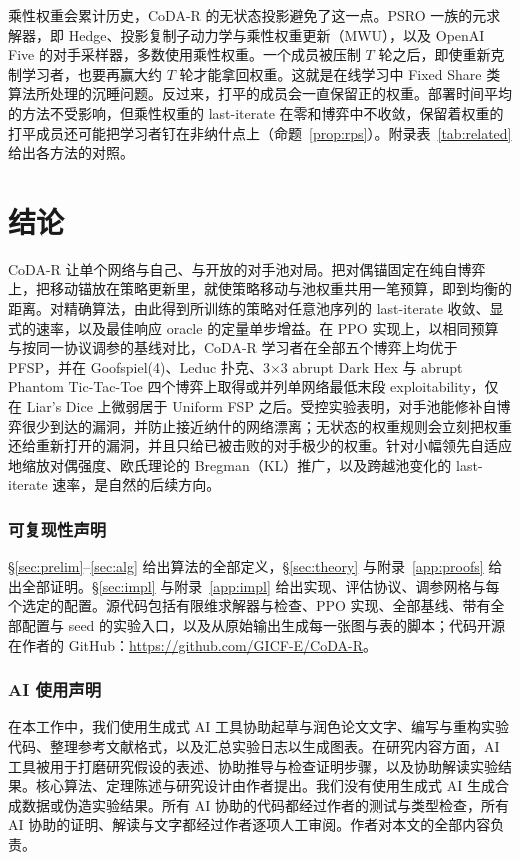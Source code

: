 \documentclass{article}
\theoremstyle{plain}
\theoremstyle{remark}
\newcommand{\codar}{CoDA-R}
\begin{document}
乘性权重会累计历史，\codar{} 的无状态投影避免了这一点。PSRO 一族的元求解器，即 Hedge、投影复制子动力学与乘性权重更新（MWU），以及 OpenAI Five 的对手采样器，多数使用乘性权重\citep{lanctot2017psro,mcaleer2022anytime,dinh2022odo,openai2019dota,freund1999hedge}。一个成员被压制 $T$ 轮之后，即使重新克制学习者，也要再赢大约 $T$ 轮才能拿回权重。这就是在线学习中 Fixed Share 类算法所处理的沉睡问题\citep{herbster1998tracking}。反过来，打平的成员会一直保留正的权重。部署时间平均的方法不受影响，但乘性权重的 last-iterate 在零和博弈中不收敛\citep{bailey2018mwu}，保留着权重的打平成员还可能把学习者钉在非纳什点上（命题~\ref{prop:rps}）。附录表~\ref{tab:related} 给出各方法的对照。

\section{结论}

\codar{} 让单个网络与自己、与开放的对手池对局。把对偶锚固定在纯自博弈上，把移动锚放在策略更新里，就使策略移动与池权重共用一笔预算，即到均衡的距离。对精确算法，由此得到所训练的策略对任意池序列的 last-iterate 收敛、显式的速率，以及最佳响应 oracle 的定量单步增益。在 PPO 实现上，以相同预算与按同一协议调参的基线对比，\codar{} 学习者在全部五个博弈上均优于 PFSP，并在 Goofspiel(4)、Leduc 扑克、3$\times$3 abrupt Dark Hex 与 abrupt Phantom Tic-Tac-Toe 四个博弈上取得或并列单网络最低末段 exploitability，仅在 Liar's Dice 上微弱居于 Uniform FSP 之后。受控实验表明，对手池能修补自博弈很少到达的漏洞，并防止接近纳什的网络漂离；无状态的权重规则会立刻把权重还给重新打开的漏洞，并且只给已被击败的对手极少的权重。针对小幅领先自适应地缩放对偶强度、欧氏理论的 Bregman（KL）推广，以及跨越池变化的 last-iterate 速率，是自然的后续方向。

\subsubsection*{可复现性声明}
\S\ref{sec:prelim}--\ref{sec:alg} 给出算法的全部定义，\S\ref{sec:theory} 与附录~\ref{app:proofs} 给出全部证明。\S\ref{sec:impl} 与附录~\ref{app:impl} 给出实现、评估协议、调参网格与每个选定的配置。源代码包括有限维求解器与检查、PPO 实现、全部基线、带有全部配置与 seed 的实验入口，以及从原始输出生成每一张图与表的脚本；代码开源在作者的 GitHub：\url{https://github.com/GICF-E/CoDA-R}。

\subsubsection*{AI 使用声明}
在本工作中，我们使用生成式 AI 工具协助起草与润色论文文字、编写与重构实验代码、整理参考文献格式，以及汇总实验日志以生成图表。在研究内容方面，AI 工具被用于打磨研究假设的表述、协助推导与检查证明步骤，以及协助解读实验结果。核心算法、定理陈述与研究设计由作者提出。我们没有使用生成式 AI 生成合成数据或伪造实验结果。所有 AI 协助的代码都经过作者的测试与类型检查，所有 AI 协助的证明、解读与文字都经过作者逐项人工审阅。作者对本文的全部内容负责。
\end{document}
